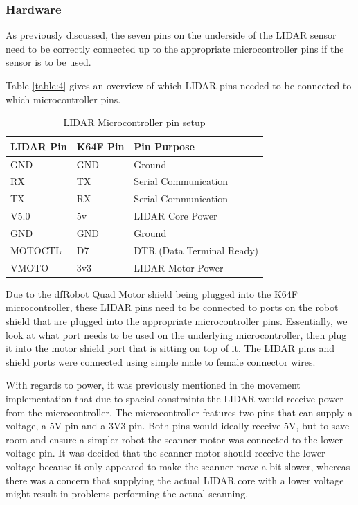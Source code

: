 				\subsubsection{Hardware}
				As previously discussed, the seven pins on the underside of the LIDAR sensor need to be correctly connected up to the appropriate microcontroller pins if the sensor is to be used.
				
				Table \ref{table:4} gives an overview of which LIDAR pins needed to be connected to which microcontroller pins.
				
				\begin{table}[h!]
					\centering
					\begin{tabular}{| l | l | l |} 
						\hline
						LIDAR Pin & K64F Pin & Pin Purpose \\ [0.5ex] 
						\hline
						GND  & GND & Ground  \\ 
						RX  & TX  & Serial Communication \\
						TX  & RX & Serial Communication \\
						V5.0 & 5v & LIDAR Core Power \\ 
						GND & GND & Ground \\ 
						MOTOCTL & D7 & DTR (Data Terminal Ready) \\ 
						VMOTO & 3v3 & LIDAR Motor Power \\ [1ex] 
						\hline
					\end{tabular}
					\caption{LIDAR Microcontroller pin setup}
					\label{table:3}
				\end{table}
			
				Due to the dfRobot Quad Motor shield being plugged into the K64F microcontroller, these LIDAR pins need to be connected to ports on the robot shield that are plugged into the appropriate microcontroller pins. Essentially, we look at what port needs to be used on the underlying microcontroller, then plug it into the motor shield port that is sitting on top of it. The LIDAR pins and shield ports were connected using simple male to female connector wires.
				
				With regards to power, it was previously mentioned in the movement implementation that due to spacial constraints the LIDAR would receive power from the microcontroller. The microcontroller features two pins that can supply a voltage, a 5V pin and a 3V3 pin. Both pins would ideally receive 5V, but to save room and ensure a simpler robot the scanner motor was connected to the lower voltage pin. It was decided that the scanner motor should receive the lower voltage because it only appeared to make the scanner move a bit slower, whereas there was a concern that supplying the actual LIDAR core with a lower voltage might result in problems performing the actual scanning. 
				
